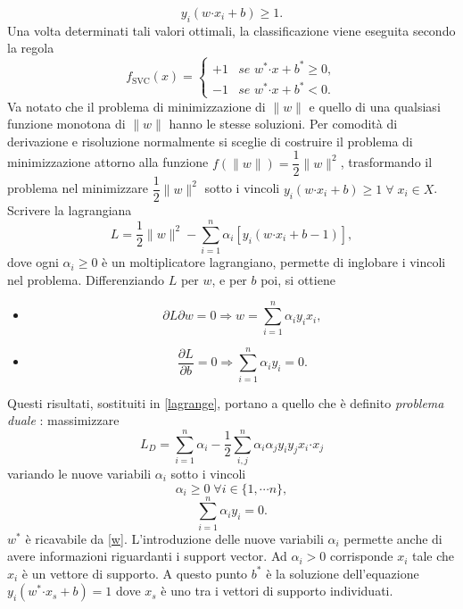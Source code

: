 \documentclass [11pt,a4paper,twoside,openright] {book}
\begin{document}
\begin{equation}
y_i(w\boldsymbol{\cdot}x_i + b) \geq 1.
\end{equation}
Una volta determinati tali valori ottimali, la classificazione viene eseguita secondo la regola
\begin{equation}\label{fsvm}
f_\mathrm{SVC}(x)=
\begin{cases}
+1 & \textit{se } w^* \boldsymbol{\cdot} x + b^* \geq 0, \\
-1 & \textit{se } w^* \boldsymbol{\cdot} x  + b^*< 0.
\end{cases}
\end{equation}
Va notato che il problema di minimizzazione di $\parallel w \parallel$ e quello di una qualsiasi funzione monotona di $\parallel w \parallel$ hanno le stesse soluzioni. Per comodità di derivazione e risoluzione normalmente si sceglie di costruire il problema di minimizzazione attorno alla funzione $f(\parallel w \parallel) = \dfrac{1}{2}\parallel w \parallel ^2$, trasformando il problema nel minimizzare $\dfrac{1}{2}\parallel w \parallel ^2$ sotto i vincoli $ y_i(w\boldsymbol{\cdot}x_i + b) \geq 1 \; \forall \; x_i \in X$. Scrivere la lagrangiana
\begin{equation}
\label{lagrange}
L = \dfrac{1}{2}\parallel w\parallel ^2 - \sum_{i=1}^n \alpha_i [y_i(w \boldsymbol{\cdot} x_i +b -1)],
\end{equation}
dove ogni $\alpha_i \geq 0$ è un moltiplicatore lagrangiano, permette di inglobare i vincoli nel problema. Differenziando $L$ per $w$, e per $b$ poi, si ottiene
\begin{itemize}
\item[]\begin{equation}\label{w}
{\partial L}{\partial w} = 0 \Longrightarrow w = \sum_{i=1}^n \alpha_i y_i x_i,
\end{equation}
\item[]\begin{equation}\label{b}\dfrac{\partial L}{\partial b} = 0 \Longrightarrow \sum_{i=1}^n \alpha_i y_i = 0.
\end{equation}
\end{itemize}
Questi risultati, sostituiti in \eqref{lagrange}, portano a quello che è definito \textit{problema duale} \cite{fletcher1987practical}: massimizzare
\begin{equation}\label{duale}
L_D = \sum_{i=1}^n \alpha_i -\dfrac{1}{2} \sum_{i,j}^n \alpha_i \alpha_j y_i y_j x_i \boldsymbol{\cdot} x_j
\end{equation}
variando le nuove variabili $\alpha_i$ sotto i vincoli
\begin{equation}
\alpha_i \geq 0 \; \forall i \in \lbrace 1, \cdots n \rbrace,
\end{equation}
\begin{equation}
\sum_{i=1}^n \alpha_i y_i = 0.
\end{equation}
$w^*$ è ricavabile da \ref{w}. L'introduzione delle nuove variabili $\alpha_i$ permette anche di avere informazioni riguardanti i support vector. Ad $\alpha_i > 0$ corrisponde $x_i$ tale che $x_i$ è un vettore di supporto. A questo punto $b^*$ è la soluzione dell'equazione $y_i(w^* \boldsymbol{\cdot} x_s + b)= 1$ dove $x_s$ è uno tra i vettori di supporto individuati. 
\end{document}
